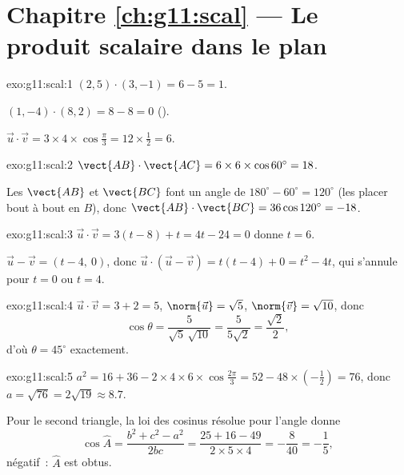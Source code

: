 \section*{Chapitre \ref{ch:g11:scal} --- Le produit scalaire dans le plan}

\begin{solution}{exo:g11:scal:1}
$(2,5)\cdot(3,-1) = 6 - 5 = 1$.

$(1,-4)\cdot(8,2) = 8 - 8 = 0$ ().

$\vec u\cdot\vec v = 3 \times 4 \times \cos\frac\pi3 = 12 \times \frac12
= 6$.
\end{solution}

\begin{solution}{exo:g11:scal:2}
$\vect{AB}\cdot\vect{AC} = 6 \times 6 \times \cos 60^\circ = 18$.

Les  $\vect{AB}$ et $\vect{BC}$ font un angle de
$180^\circ - 60^\circ = 120^\circ$ (les placer bout à bout en $B$), donc
$\vect{AB}\cdot\vect{BC} = 36 \cos 120^\circ = -18$.
\end{solution}

\begin{solution}{exo:g11:scal:3}
$\vec u \cdot \vec v = 3(t - 8) + t = 4t - 24 = 0$ donne $t = 6$.

$\vec u - \vec v = (t - 4,\ 0)$, donc
$\vec u \cdot (\vec u - \vec v) = t(t-4) + 0 = t^2 - 4t$, qui s'annule
pour $t = 0$ ou $t = 4$.
\end{solution}

\begin{solution}{exo:g11:scal:4}
$\vec u \cdot \vec v = 3 + 2 = 5$, $\norm{\vec u} = \sqrt5$,
$\norm{\vec v} = \sqrt{10}$, donc
\[
\cos\theta = \frac{5}{\sqrt5\,\sqrt{10}} = \frac{5}{5\sqrt2}
= \frac{\sqrt2}{2},
\]
d'où $\theta = 45^\circ$ exactement.
\end{solution}

\begin{solution}{exo:g11:scal:5}
$a^2 = 16 + 36 - 2 \times 4 \times 6 \times \cos\frac{2\pi}{3}
= 52 - 48 \times \left(-\frac12\right) = 76$, donc $a = \sqrt{76} =
2\sqrt{19} \approx 8.7$.

Pour le second triangle, la loi des cosinus résolue pour l'angle donne
\[
\cos\widehat A = \frac{b^2 + c^2 - a^2}{2bc}
= \frac{25 + 16 - 49}{2 \times 5 \times 4} = -\frac{8}{40} = -\frac15,
\]
négatif~: $\widehat A$ est obtus.
\end{solution}

